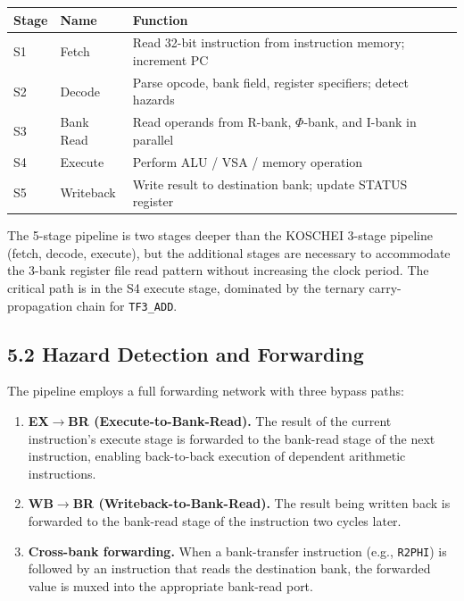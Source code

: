 \begin{longtable}[]{@{}llp{8cm}@{}}
\toprule\noalign{}
Stage & Name & Function \\
\midrule\noalign{}
\endhead
\bottomrule\noalign{}
\endlastfoot
S1 & Fetch & Read 32-bit instruction from instruction memory; increment PC \\
S2 & Decode & Parse opcode, bank field, register specifiers; detect hazards \\
S3 & Bank Read & Read operands from R-bank, $\Phi$-bank, and I-bank in parallel \\
S4 & Execute & Perform ALU / VSA / memory operation \\
S5 & Writeback & Write result to destination bank; update STATUS register \\
\end{longtable}

The 5-stage pipeline is two stages deeper than the KOSCHEI
3-stage pipeline (fetch, decode, execute), but the additional
stages are necessary to accommodate the 3-bank register file
read pattern without increasing the clock period. The critical
path is in the S4 execute stage, dominated by the ternary
carry-propagation chain for \texttt{TF3\_ADD}.

\subsection{5.2 Hazard Detection and Forwarding}\label{fa_71:hazard-detection}

The pipeline employs a full forwarding network with three
bypass paths:

\begin{enumerate}
\def\labelenumi{\arabic{enumi}.}
\item
  \textbf{EX$\to$BR (Execute-to-Bank-Read).} The result
  of the current instruction's execute stage is forwarded to
  the bank-read stage of the next instruction, enabling
  back-to-back execution of dependent arithmetic instructions.
\item
  \textbf{WB$\to$BR (Writeback-to-Bank-Read).} The result
  being written back is forwarded to the bank-read stage of
  the instruction two cycles later.
\item
  \textbf{Cross-bank forwarding.} When a bank-transfer
  instruction (e.g., \texttt{R2PHI}) is followed by an
  instruction that reads the destination bank, the forwarded
  value is muxed into the appropriate bank-read port.
\end{enumerate}

